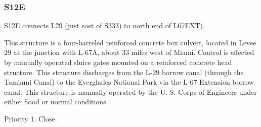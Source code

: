 \subsubsection{S12E}

S12E connects L29 (just east of S333) to north end of L67EXT).

This structure is a four-barreled reinforced concrete box culvert, located in Levee 29 at the junction with L-67A, about 33 miles west of Miami. Control is effected by manually operated sluice gates mounted on a reinforced concrete head structure. This structure discharges from the L-29 borrow canal (through the Tamiami Canal) to the Everglades National Park via the L-67 Extension borrow canal. This structure is manually operated by the U. S. Corps of Engineers under either flood or normal conditions.




\begin{packed_items}
\item Priority 1: Close.
\end{packed_items}

%
%

